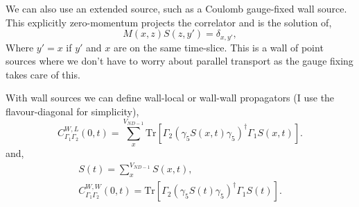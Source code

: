 We can also use an extended source, such as a Coulomb gauge-fixed wall source.
This explicitly zero-momentum projects the correlator and is the solution of,
\begin{equation}
M(x,z)S(z,y') = \delta_{x,y'},
\end{equation}
Where $y'=x$ if $y'$ and $x$ are on the same time-slice. This is a wall
of point sources where we don't have to worry about parallel transport as
the gauge fixing takes care of this.

With wall sources we can define wall-local or wall-wall propagators
(I use the flavour-diagonal for simplicity),
\begin{equation}
C_{\Gamma_1\Gamma_2}^{W,L}(0,t)=\sum_{x}^{V_{ND-1}}\text{Tr}
\left[\Gamma_2 \left( \gamma_5 S(x,t) \gamma_5 \right)^{\dagger} \Gamma_1 S(x,t) \right].
\end{equation}
and,
\begin{equation}
\begin{gathered}
S(t) = \sum_{x}^{V_{ND-1}} S(x,t), \\
C_{\Gamma_1\Gamma_2}^{W,W}(0,t)=\text{Tr}
\left[\Gamma_2 \left( \gamma_5 S(t) \gamma_5 \right)^{\dagger} \Gamma_1 S(t) \right].
\end{gathered}
\end{equation}
